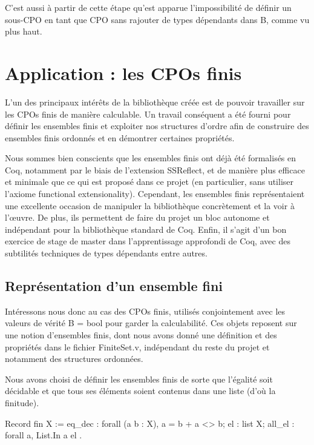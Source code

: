 \documentclass{article}
\newcommand\code[1]{{\fontfamily{lmtt}\selectfont #1}}
\theoremstyle{definition}
\begin{document}
C'est aussi à partir de cette étape qu'est apparue l'impossibilité de définir un sous-CPO en tant que CPO sans rajouter de types dépendants dans \code{B}, comme vu plus haut.



\section{Application : les CPOs finis}

L'un des principaux intérêts de la bibliothèque créée est de pouvoir travailler sur les CPOs finis de manière calculable. Un travail conséquent a été fourni pour définir les ensembles finis et exploiter nos structures d'ordre afin de construire des ensembles finis ordonnés et en démontrer certaines propriétés.

Nous sommes bien conscients que les ensembles finis ont déjà été formalisés en Coq, notamment par le biais de l'extension SSReflect, et de manière plus efficace et minimale que ce qui est proposé dans ce projet (en particulier, sans utiliser l'axiome \code{functional extensionality}). Cependant, les ensembles finis représentaient une excellente occasion de manipuler la bibliothèque concrètement et la voir à l’œuvre. De plus, ils permettent de faire du projet un bloc autonome et indépendant pour la bibliothèque standard de Coq. Enfin, il s'agit d'un bon exercice de stage de master dans l'apprentissage approfondi de Coq, avec des subtilités techniques de types dépendants entre autres.


\subsection{Représentation d'un ensemble fini}
\label{finis}

Intéressons nous donc au cas des CPOs finis, utilisés conjointement avec les valeurs de vérité \code{B = bool} pour garder la calculabilité. Ces objets reposent sur une notion d'ensembles finis, dont nous avons donné une définition et des propriétés dans le fichier \code{FiniteSet.v}, indépendant du reste du projet et notamment des structures ordonnées.

Nous avons choisi de définir les ensembles finis de sorte que l'égalité soit décidable et que tous ses éléments soient contenus dans une liste (d'où la finitude).

\begin{coq}
Record fin X := {
  eq_dec : forall (a b : X), {a = b} + {a <> b};
  el : list X;
  all_el : forall a, List.In a el
  }.
\end{coq}
\end{document}
